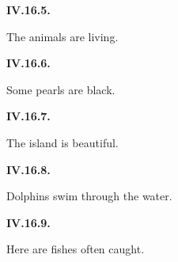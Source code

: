\par\begin{minipage}{\linewidth}\raggedright
\textbf{IV.16.5.}

The animals are living.

\end{minipage}\par\addvspace{4pt}

\par\begin{minipage}{\linewidth}\raggedright
\textbf{IV.16.6.}

Some pearls are black.

\end{minipage}\par\addvspace{4pt}

\par\begin{minipage}{\linewidth}\raggedright
\textbf{IV.16.7.}

The island is beautiful.

\end{minipage}\par\addvspace{4pt}

\par\begin{minipage}{\linewidth}\raggedright
\textbf{IV.16.8.}

Dolphins swim through the water.

\end{minipage}\par\addvspace{4pt}

\par\begin{minipage}{\linewidth}\raggedright
\textbf{IV.16.9.}

Here are fishes often caught.

\end{minipage}\par\addvspace{4pt}

